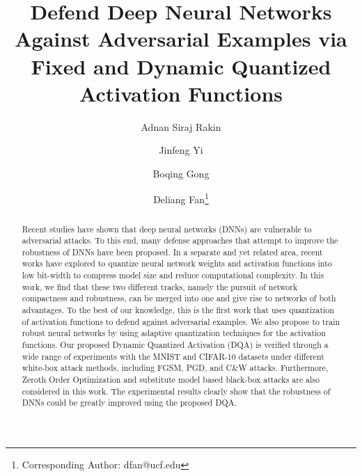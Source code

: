 \documentclass{article}
\title{Defend Deep Neural Networks Against Adversarial Examples via Fixed and Dynamic Quantized Activation Functions}
\author[1]{Adnan Siraj Rakin}
\author[2]{Jinfeng Yi}
\author[3]{Boqing Gong}
\author[1]{Deliang Fan\thanks{Corresponding Author: dfan@ucf.edu}}
\affil[1]{Department of Computer Engineering, University of Central Florida}
\affil[2]{JD AI Research, Beijing, China}
\affil[3]{Tencent AI Lab, Bellevue, WA, USA}
\date{}
\begin{document}
\maketitle

\begin{abstract}
Recent studies have shown that deep neural networks (DNNs) are vulnerable to adversarial attacks. To this end, many defense approaches that attempt to improve the robustness of DNNs have been proposed. In a separate and yet related area, recent works have explored to quantize neural network weights and activation functions into low bit-width to compress model size and reduce computational complexity. In this work, we find that these two different tracks, namely the pursuit of network compactness and robustness, can be merged into one and give rise to  networks of both advantages. To the best of our knowledge, this is the first work that uses quantization of activation functions to defend against adversarial examples. We also propose to train robust neural networks by using adaptive  quantization techniques for the activation functions. Our proposed Dynamic Quantized Activation (DQA) is verified through a wide range of experiments with the MNIST and CIFAR-10 datasets under different white-box attack methods, including FGSM, PGD, and C\&W attacks. Furthermore, Zeroth Order Optimization and substitute model based black-box attacks are also considered in this work. The experimental results clearly show that the robustness of DNNs could be greatly improved using the proposed DQA. 


\end{abstract}
\end{document}
